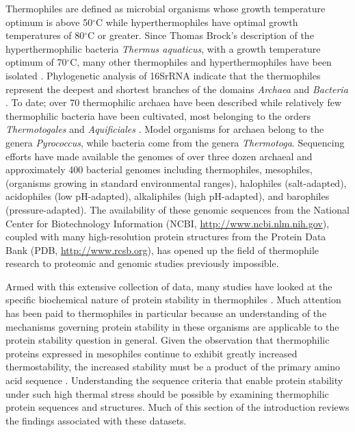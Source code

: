 {Thermophiles are defined as microbial organisms whose growth temperature
optimum is above 50$^\circ$C while hyperthermophiles have optimal growth
temperatures of 80$^\circ$C or greater. Since Thomas Brock's description of the
hyperthermophilic bacteria \emph{Thermus aquaticus}, with a growth temperature
optimum of 70$^\circ$C, many other thermophiles and hyperthermophiles have been
isolated \cite{brock1969tag}.  Phylogenetic analysis of 16SrRNA indicate that
the thermophiles represent the deepest and shortest branches of the domains
\emph{Archaea} and \emph{Bacteria} \cite{PMID_10376671}.  To date; over 70
thermophilic archaea have been described while relatively few thermophilic
bacteria have been cultivated, most belonging to the orders
\emph{Thermotogales} and \emph{Aquificiales} \cite{PMID_11256505}. Model
organisms for archaea belong to the genera \emph{Pyrococcus}, while bacteria
come from the genera \emph{Thermotoga}. Sequencing efforts have made
available the genomes of over three dozen archaeal and approximately 400
bacterial genomes including thermophiles, mesophiles, (organisms growing in
standard environmental ranges), halophiles (salt-adapted), acidophiles (low
pH-adapted), alkaliphiles (high pH-adapted), and barophiles (pressure-adapted).
The availability of these genomic sequences from the National Center for
Biotechnology Information (NCBI, \url{http://www.ncbi.nlm.nih.gov}), coupled
with many high-resolution protein structures from the Protein Data Bank (PDB,
\url{http://www.rcsb.org}), has opened up the field of thermophile research to
proteomic and genomic studies previously impossible.  


Armed with this extensive collection of data, many studies have looked at the
specific biochemical nature of protein stability in thermophiles
\cite{jaenicke1998spe,PMID_11577980,PMID_10097079,PMID_10940293,thompson1999tel,PMID_11256505}.
Much attention has been paid to thermophiles in particular because an
understanding of the mechanisms governing protein stability in these organisms
are applicable to the protein stability question in general.  Given the
observation that thermophilic proteins expressed in mesophiles continue to
exhibit greatly increased thermostability, the increased stability must be a
product of the primary amino acid sequence \cite{razvi2006lst}.  Understanding
the sequence criteria that enable protein stability under such high thermal
stress should be possible by examining thermophilic protein sequences and
structures.  Much of this section of the introduction reviews the findings
associated with these datasets.

}

